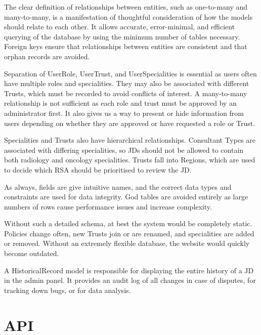 The clear definition of relationships between entities, such as one-to-many and many-to-many, is a manifestation of thoughtful consideration of how the models should relate to each other. It allows accurate, error-minimal, and efficient querying of the database by using the minimum number of tables necessary. Foreign keys ensure that relationships between entities are consistent and that orphan records are avoided.

Separation of UserRole, UserTrust, and UserSpecialities is essential as users often have multiple roles and specialities. They may also be associated with different Trusts, which must be recorded to avoid conflicts of interest. A many-to-many relationship is not sufficient as each role and trust must be approved by an administrator first. It also gives us a way to present or hide information from users depending on whether they are approved or have requested a role or Trust.

Specialities and Trusts also have hierarchical relationships. Consultant Types are associated with differing specialities, so JDs should not be allowed to contain both radiology and oncology specialities. Trusts fall into Regions, which are used to decide which RSA should be prioritised to review the JD.

As always, fields are give intuitive names, and the correct data types and constraints are used for data integrity. God tables are avoided entirely as large numbers of rows cause performance issues and increase complexity.

Without such a detailed schema, at best the system would be completely static. Policies change often, new Trusts join or are renamed, and specialities are added or removed. Without an extremely flexible database, the website would quickly become outdated.

A HistoricalRecord model is responsible for displaying the entire history of a JD in the admin panel. It provides an audit log of all changes in case of disputes, for tracking down bugs, or for data analysis.

\section{API}
